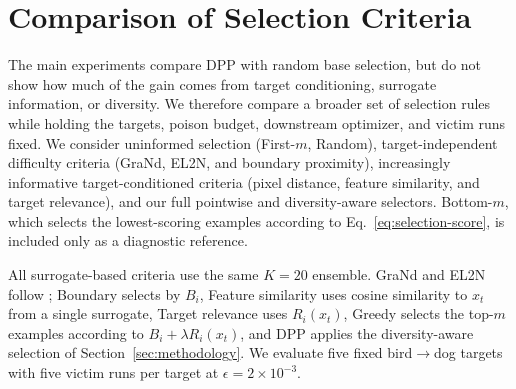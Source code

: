 \section{Comparison of Selection Criteria}
\label{sec:selection-ladder}

The main experiments compare DPP with random base selection, but do not
show how much of the gain comes from target conditioning, surrogate
information, or diversity. We therefore compare a broader set of
selection rules while holding the targets, poison budget, downstream
optimizer, and victim runs fixed. We consider uninformed selection
(First-$m$, Random), target-independent difficulty criteria (GraNd,
EL2N, and boundary proximity), increasingly informative
target-conditioned criteria (pixel distance, feature similarity, and
target relevance), and our full pointwise and diversity-aware selectors.
Bottom-$m$, which selects the lowest-scoring examples according to
Eq.~\eqref{eq:selection-score}, is included only as a diagnostic
reference.

All surrogate-based criteria use the same $K=20$ ensemble. GraNd and
EL2N follow \citet{paul2021deep}; Boundary selects by $B_i$, Feature
similarity uses cosine similarity to $x_t$ from a single surrogate,
Target relevance uses $R_i(x_t)$, Greedy selects the top-$m$ examples
according to $B_i+\lambda R_i(x_t)$, and DPP applies the diversity-aware
selection of Section~\ref{sec:methodology}. We evaluate five fixed
bird$\rightarrow$dog targets with five victim runs per target at
$\epsilon=2\times10^{-3}$.

